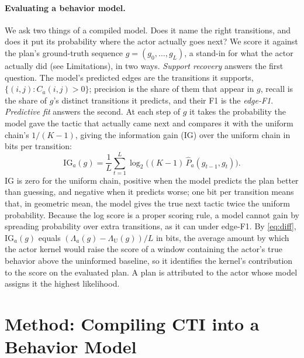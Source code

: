 \documentclass[letterpaper]{article} %
\begin{document}
\paragraph{Evaluating a behavior model.} We ask two things of a compiled model. Does it name the right transitions, and does it put its probability where the actor actually goes next? We score it against the plan's ground-truth sequence $g=(g_0,\ldots,g_L)$, a stand-in for what the actor actually did (see Limitations), in two ways. \emph{Support recovery} answers the first question. The model's predicted edges are the transitions it supports, $\{(i,j):C_a(i,j)>0\}$; precision is the share of them that appear in $g$, recall is the share of $g$'s distinct transitions it predicts, and their F1 is the \emph{edge-F1}. \emph{Predictive fit} answers the second. At each step of $g$ it takes the probability the model gave the tactic that actually came next and compares it with the uniform chain's $1/(K-1)$, giving the information gain (IG) over the uniform chain in bits per transition:
\begin{equation}
\mathrm{IG}_a(g)=\frac{1}{L}\sum_{t=1}^{L}\log_2\bigl((K-1)\,\hat P_a(g_{t-1},g_t)\bigr).
\label{eq:ig}
\end{equation}
IG is zero for the uniform chain, positive when the model predicts the plan better than guessing, and negative when it predicts worse; one bit per transition means that, in geometric mean, the model gives the true next tactic twice the uniform probability. Because the log score is a proper scoring rule, a model cannot gain by spreading probability over extra transitions, as it can under edge-F1. By \eqref{eq:diff}, $\mathrm{IG}_a(g)$ equals $(\Lambda_a(g)-\Lambda_{\mathrm{U}}(g))/L$ in bits, the average amount by which the actor kernel would raise the score of a window containing the actor's true behavior above the uninformed baseline, so it identifies the kernel's contribution to the score on the evaluated plan. A plan is attributed to the actor whose model assigns it the highest likelihood.

\section{Method: Compiling CTI into a Behavior Model}
\end{document}
